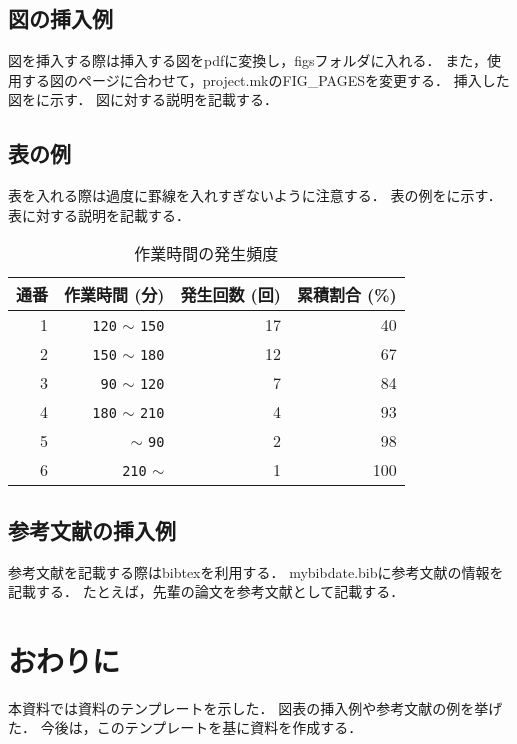 \documentclass[fleqn, 14pt]{sty/extarticlej}
\begin{document}
\subsection{図の挿入例}
図を挿入する際は挿入する図をpdfに変換し，figsフォルダに入れる．
また，使用する図のページに合わせて，project.mkのFIG\_PAGESを変更する．
挿入した図をに示す．
図に対する説明を記載する．


\subsection{表の例}
表を入れる際は過度に罫線を入れすぎないように注意する．
表の例をに示す．
表に対する説明を記載する．

\begin{table}[tb]
  \begin{center}
    \caption{作業時間の発生頻度}\label{tab:time_range_ratio}
    \begin{tabular}{r|r|r|r}
      \hline\hline
      \multicolumn{1}{l|}{通番} & \multicolumn{1}{l|}{作業時間 (分)} & \multicolumn{1}{l|}{発生回数 (回)} & \multicolumn{1}{l}{累積割合 (\%)}\\
      \hline
      1 & {\texttt{120}} $\sim$ {\texttt{150}} & 17 & 40\\
      2 & {\texttt{150}} $\sim$ {\texttt{180}} & 12 & 67\\
      3 & {\texttt{90}} $\sim$ {\texttt{120}} & 7 & 84\\
      4 & {\texttt{180}} $\sim$ {\texttt{210}} & 4 & 93\\
      5 & $\sim$ {\texttt{90}} & 2 & 98\\
      6 & {\texttt{210}} $\sim$ & 1 & 100\\
      \hline
    \end{tabular}
  \end{center}
\end{table}

\subsection{参考文献の挿入例}
参考文献を記載する際はbibtexを利用する．
mybibdate.bibに参考文献の情報を記載する．
たとえば，先輩の論文\cite{yoshii2015a}を参考文献として記載する．

\section{おわりに}
本資料では資料のテンプレートを示した．
図表の挿入例や参考文献の例を挙げた．
今後は，このテンプレートを基に資料を作成する．



\end{document}
